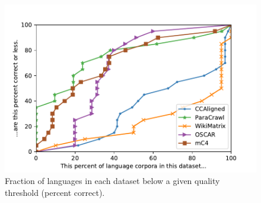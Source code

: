\begin{figure}[th]
    \centering
    \includegraphics[width=\columnwidth]{static/media/data/quality/num_C_ratio.pdf}
    \caption{Fraction of languages in each dataset below a given quality threshold (percent correct).}%
    \label{fig:ratio_c}
\end{figure}



